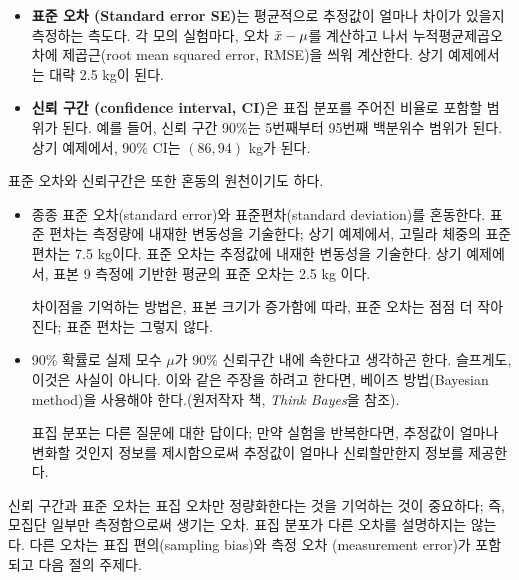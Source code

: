 \begin{itemize}

\item {\bf 표준 오차 (Standard error SE)}는 평균적으로 추정값이 얼마나 차이가 있을지 측정하는 측도다. 각 모의 실험마다, 오차 $\bar{x} - \mu$를 계산하고 나서 누적평균제곱오차에 제곱근(root mean squared error, RMSE)을 씌워 계산한다. 상기 예제에서는 대략 2.5 kg이 된다.

\item {\bf 신뢰 구간 (confidence interval, CI)}은 표집 분포를 주어진 비율로 포함할 범위가 된다. 예를 들어, 신뢰 구간 90\%는 5번째부터 95번째 백분위수 범위가 된다. 상기 예제에서, 90\% CI는 $(86, 94)$ kg가 된다.

\end{itemize}

표준 오차와 신뢰구간은 또한 혼동의 원천이기도 하다.

\begin{itemize}

\item 종종 표준 오차(standard error)와 표준편차(standard deviation)를 혼동한다. 표준 편차는 측정량에 내재한 변동성을 기술한다; 상기 예제에서, 고릴라 체중의 표준 편차는 7.5 kg이다. 표준 오차는 추정값에 내재한 변동성을 기술한다. 상기 예제에서, 표본 9 측정에 기반한 평균의 표준 오차는 2.5 kg 이다.


차이점을 기억하는 방법은, 표본 크기가 증가함에 따라, 
표준 오차는 점점 더 작아진다; 표준 편차는 그렇지 않다.
  
\item 90\% 확률로 실제 모수 $\mu$가 90\% 신뢰구간 내에 속한다고 생각하곤 한다. 슬프게도, 이것은 사실이 아니다.
이와 같은 주장을 하려고 한다면, 베이즈 방법(Bayesian method)을 사용해야 한다.(원저작자 책, {\it Think Bayes}을 참조).

표집 분포는 다른 질문에 대한 답이다; 만약 실험을 반복한다면, 추정값이 얼마나 변화할 것인지 정보를 제시함으로써 추정값이 얼마나 신뢰할만한지 정보를 제공한다.

\end{itemize}

신뢰 구간과 표준 오차는 표집 오차만 정량화한다는 것을 기억하는 것이 중요하다; 즉, 모집단 일부만 측정함으로써 생기는 오차.
표집 분포가 다른 오차를 설명하지는 않는다.
다른 오차는 표집 편의(sampling bias)와 측정 오차 (measurement error)가 포함되고 다음 절의 주제다. 

